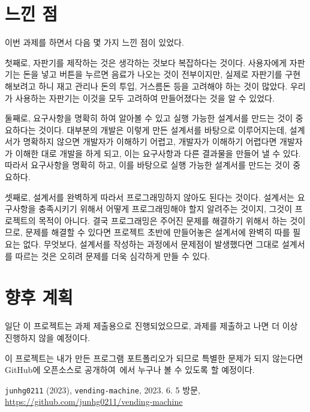 \documentclass{oblivoir}
\begin{document}
    \section{느낀 점}

    이번 과제를 하면서 다음 몇 가지 느낀 점이 있었다.

    첫째로, 자판기를 제작하는 것은 생각하는 것보다 복잡하다는 것이다.
    사용자에게 자판기는 돈을 넣고 버튼을 누르면 음료가 나오는 것이 전부이지만,
    실제로 자판기를 구현해보려고 하니 재고 관리나 돈의 투입, 거스름돈 등을 고려해야 하는 것이 많았다.
    우리가 사용하는 자판기는 이것을 모두 고려하여 만들어졌다는 것을 알 수 있었다.

    둘째로, 요구사항을 명확히 하여 알아볼 수 있고 실행 가능한 설계서를 만드는 것이 중요하다는 것이다.
    대부분의 개발은 이렇게 만든 설계서를 바탕으로 이루어지는데,
    설계서가 명확하지 않으면 개발자가 이해하기 어렵고, 개발자가 이해하기 어렵다면
    개발자가 이해한 대로 개발을 하게 되고, 이는 요구사항과 다른 결과물을 만들어 낼 수 있다.
    따라서 요구사항을 명확히 하고, 이를 바탕으로 실행 가능한 설계서를 만드는 것이 중요하다.

    셋째로, 설계서를 완벽하게 따라서 프로그래밍하지 않아도 된다는 것이다.
    설계서는 요구사항을 충족시키기 위해서 어떻게 프로그래밍해야 할지 알려주는 것이지,
    그것이 프로젝트의 목적이 아니다.
    결국 프로그래밍은 주어진 문제를 해결하기 위해서 하는 것이므로,
    문제를 해결할 수 있다면 프로젝트 초반에 만들어놓은 설계서에 완벽히 따를 필요는 없다.
    무엇보다, 설계서를 작성하는 과정에서 문제점이 발생했다면
    그대로 설계서를 따르는 것은 오히려 문제를 더욱 심각하게 만들 수 있다.

    \section{향후 계획}

    일단 이 프로젝트는 과제 제출용으로 진행되었으므로, 과제를 제출하고 나면
    더 이상 진행하지 않을 예정이다.

    이 프로젝트는 내가 만든 프로그램 포트폴리오가 되므로
    특별한 문제가 되지 않는다면
    GitHub에 오픈소스로 공개하여~\cite{github}에서 누구나 볼 수 있도록 할 예정이다.

    \begin{thebibliography}{1}
        \texttt{junhg0211} (2023), \texttt{vending-machine}, 2023. 6. 5 방문, \url{https://github.com/junhg0211/vending-machine}
    \end{thebibliography}
\end{document}
